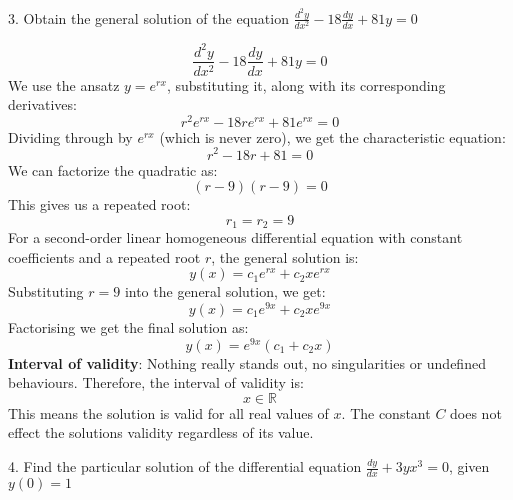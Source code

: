 \documentclass[a4paper, 12pt]{report}
\def\ni{green!60!black!40!white}
\begin{document}
    
    
    \newpage
    
    \begin{tcolorbox}[title={\color{black}\section{Q3}}, colback=white, colframe=\ni, boxrule=1mm, width=1\textwidth]
        3. Obtain the general solution of the equation \( \frac{d^2 y}{dx^2} - 18 \frac{dy}{dx} + 81y = 0 \) 
    \end{tcolorbox}
    
    

    \[ \frac{d^2 y}{dx^2} - 18 \frac{dy}{dx} + 81y = 0 \]    
    We use the ansatz \( y = e^{rx} \), substituting it, along with its corresponding derivatives:
    \[r^2 e^{rx} - 18r e^{rx} + 81 e^{rx} = 0\]
    Dividing through by \( e^{rx} \) (which is never zero), we get the characteristic equation:
    \[ r^2 - 18r + 81 = 0 \]
    We can factorize the quadratic as:
    \[(r - 9)(r - 9) = 0 \]
    This gives us a repeated root:
    \[ r_1 = r_2 = 9 \]
    For a second-order linear homogeneous differential equation with constant coefficients and a repeated root \( r \), the general solution is:
    \[ y(x) = c_1 e^{rx} + c_2 x e^{rx} \]
    Substituting \( r = 9 \) into the general solution, we get:
    \[ y(x) = c_1 e^{9x} + c_2 x e^{9x} \]
    Factorising we get the final solution as:
    \[ \boxed{y(x) = e^{9x} (c_1 + c_2 x)} \]
    \textbf{Interval of validity}: Nothing really stands out, no singularities or undefined behaviours. Therefore, the interval of validity is:
    \[x\in \mathbb{R}\]        
    This means the solution is valid for all real values of \(x\). The constant \(C\) does not effect the solutions validity regardless of its value.
       
    \newpage
    
    \begin{tcolorbox}[title={\color{black}\section{Q4}}, colback=white, colframe=\ni, boxrule=1mm, width=1\textwidth]
        4. Find the particular solution of the differential equation \( \frac{dy}{dx} + 3y x^3 = 0 \), given \( y(0) = 1 \)
    \end{tcolorbox}
    
\end{document}
